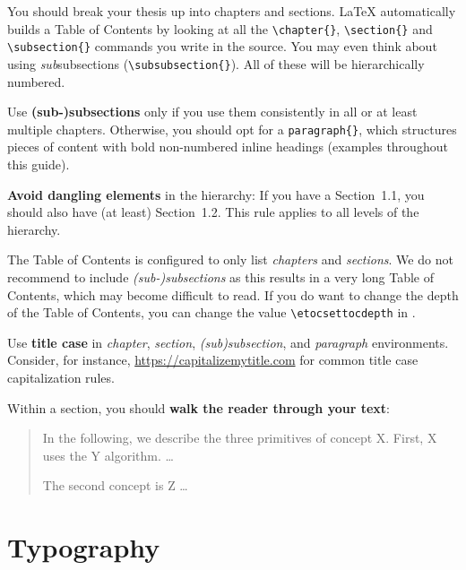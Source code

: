 You should break your thesis up into chapters and sections. LaTeX automatically builds a Table of Contents by looking at all the \verb|\chapter{}|, \verb|\section{}|  and \verb|\subsection{}| commands you write in the source. You may even think about using \emph{sub}subsections (\verb|\subsubsection{}|). All of these will be hierarchically numbered.

Use \textbf{(sub-)subsections} only if you use them consistently in all or at least multiple chapters. Otherwise, you should opt for a \verb|paragraph{}|, which structures pieces of content with bold non-numbered inline headings (examples throughout this guide).

\textbf{Avoid dangling elements} in the hierarchy: If you have a Section~1.1, you should also have (at least) Section~1.2. This rule applies to all levels of the hierarchy.

The Table of Contents is configured to only list \emph{chapters} and \emph{sections}. We do not recommend to include \emph{(sub-)subsections} as this results in a very long Table of Contents, which may become difficult to read. If you do want to change the depth of the Table of Contents, you can change the value \verb|\etocsettocdepth| in .

Use \textbf{title case} in \emph{chapter}, \emph{section}, \emph{(sub)subsection}, and \emph{paragraph} environments. Consider, for instance, \url{https://capitalizemytitle.com} for common title case capitalization rules.

Within a section, you should \textbf{walk the reader through your text}:
\begin{quote}
In the following, we describe the three primitives of concept X. First, X uses the Y algorithm. …

The second concept is Z …
\end{quote}

\section{Typography}

